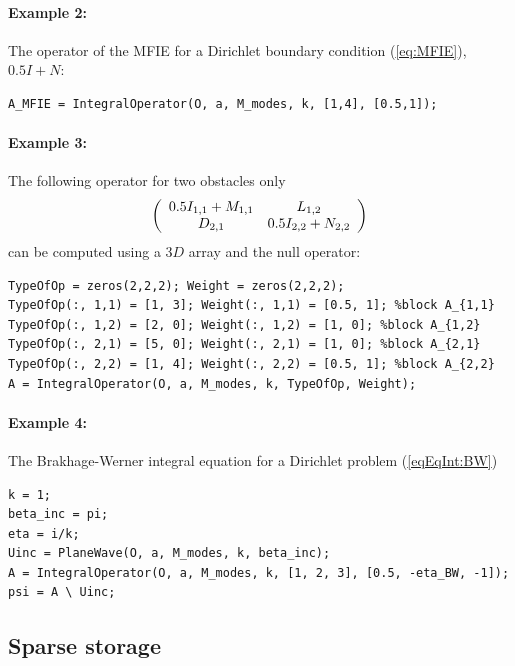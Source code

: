 \paragraph{Example 2:} The operator of the MFIE for a Dirichlet boundary condition (\ref{eq:MFIE}), $0.5I + N$:
\begin{lstlisting}
A_MFIE = IntegralOperator(O, a, M_modes, k, [1,4], [0.5,1]);
\end{lstlisting}
\paragraph{Example 3:} The following operator for two obstacles only
$$
\left(\begin{array}{c c}
0.5 I_{1,1}+ M_{1,1} & L_{1,2}\\
D_{2,1} & 0.5 I_{2,2}+N_{2,2}
\end{array}\right)
$$
can be computed using a $3D$ array and the null operator:
\begin{lstlisting}
TypeOfOp = zeros(2,2,2); Weight = zeros(2,2,2);
TypeOfOp(:, 1,1) = [1, 3]; Weight(:, 1,1) = [0.5, 1]; %block A_{1,1}
TypeOfOp(:, 1,2) = [2, 0]; Weight(:, 1,2) = [1, 0]; %block A_{1,2}
TypeOfOp(:, 2,1) = [5, 0]; Weight(:, 2,1) = [1, 0]; %block A_{2,1}
TypeOfOp(:, 2,2) = [1, 4]; Weight(:, 2,2) = [0.5, 1]; %block A_{2,2}
A = IntegralOperator(O, a, M_modes, k, TypeOfOp, Weight);
\end{lstlisting}
\paragraph{Example 4:} The Brakhage-Werner integral equation for a Dirichlet problem (\ref{eqEqInt:BW})
\begin{lstlisting}
k = 1;
beta_inc = pi;
eta = i/k;
Uinc = PlaneWave(O, a, M_modes, k, beta_inc);
A = IntegralOperator(O, a, M_modes, k, [1, 2, 3], [0.5, -eta_BW, -1]);
psi = A \ Uinc;
\end{lstlisting}

\subsection{Sparse storage}
\label{secFun:SpBlockSingleLayer}
\label{secFun:SpBlockDnSingleLayer}
\label{secFun:SpBlockDoubleLayer}
\label{secFun:SpBlockDnDoubleLayer}
\label{secFun:SpBlockPrecondDirichlet}
\label{secFun:SpBlockPrecondNeumann}
\label{secFun:SpSingleLayer}
\label{secFun:SpDnSingleLayer}
\label{secFun:SpDoubleLayer}
\label{secFun:SpDnDoubleLayer}
\label{secFun:SpPrecondDirichlet}
\label{secFun:SpPrecondNeumann}
\label{secFun:SpIdentity}

